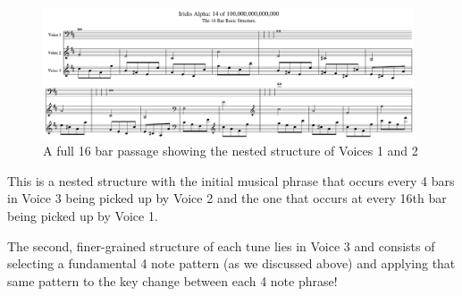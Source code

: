 \begin{figure}[H]
{
  \begin{adjustbox}{width=11cm,center}
  \includegraphics[width=11cm]{music/16BarStructure_Tune14.png}%
    \end{adjustbox}
}\caption[]{A full 16 bar passage showing the nested structure of Voices 1 and 2}
\end{figure}

This is a nested structure with the initial musical phrase that occurs every 4 bars in Voice 3 being picked up by Voice 2 and the one
that occurs at every 16th bar being picked up by Voice 1.

The second, finer-grained structure of each tune lies in Voice 3 and consists of selecting a fundamental 4 note pattern (as we 
discussed above) and applying that same pattern to the key change between each 4 note phrase! 

